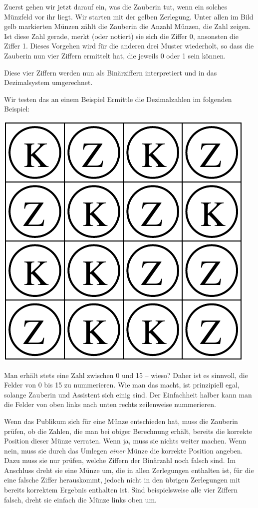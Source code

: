\documentclass{../../../zirkelblatt}
\begin{document}
Zuerst gehen wir jetzt darauf ein, was die Zauberin tut, wenn ein solches
Münzfeld vor ihr liegt. Wir starten mit der gelben Zerlegung.
Unter allen im Bild gelb markierten Münzen zählt die Zauberin die Anzahl
Münzen, die Zahl zeigen. Ist diese Zahl gerade, merkt (oder notiert) sie sich
die Ziffer 0, ansonsten die Ziffer 1. Dieses Vorgehen wird für die anderen
drei Muster wiederholt, so dass die Zauberin nun vier Ziffern ermittelt hat,
die jeweils 0 oder 1 sein können.

Diese vier Ziffern werden nun als Binärziffern interpretiert und in das
Dezimalsystem umgerechnet.

\begin{aufgabe}{Wir testen das an einem Beispiel}
Ermittle die Dezimalzahlen im folgenden Beispiel:
\begin{center}\includegraphics[scale=0.4]{beispielbild}\end{center}
Man erhält stets eine Zahl zwischen 0 und 15 -- wieso?
Daher ist es sinnvoll, die Felder von 0 bis 15 zu nummerieren. Wie man das
macht, ist prinzipiell egal, solange Zauberin und Assistent sich einig sind.
Der Einfachheit halber kann man die Felder von oben links nach unten rechts
zeilenweise nummerieren.
\end{aufgabe}

Wenn das Publikum sich für eine Münze entschieden hat, muss die Zauberin
prüfen, ob die Zahlen, die man bei obiger Berechnung erhält, bereits die
korrekte Position dieser Münze verraten. Wenn ja, muss sie nichts weiter
machen. Wenn nein, muss sie durch das Umlegen \emph{einer} Münze die korrekte
Position angeben. Dazu muss sie nur prüfen, welche Ziffern der Binärzahl noch
falsch sind. Im Anschluss dreht sie eine Münze um, die in allen Zerlegungen
enthalten ist, für die eine falsche Ziffer herauskommt, jedoch nicht in den
übrigen Zerlegungen mit bereits korrektem Ergebnis enthalten ist. Sind
beispielsweise alle vier Ziffern falsch, dreht sie einfach die Münze links oben
um.
\end{document}

